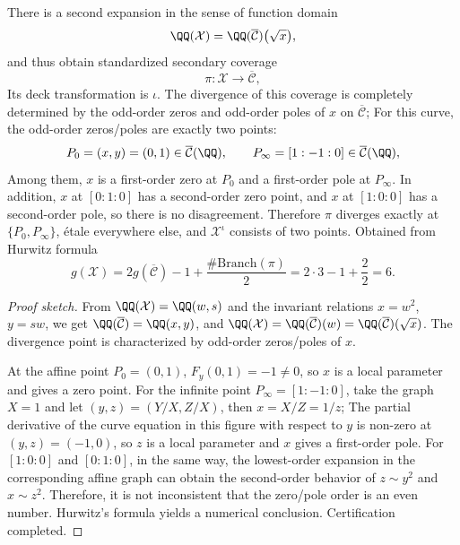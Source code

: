 \begin{proposition}[Second expansion and divergence: only two divergences and \texorpdfstring{$g(\mathcal{X})=6$}{g(X)=6}]\label{prop:sync-hatdelta-curve-double-cover-branch-genus6}
There is a second expansion in the sense of function domain
\[
\QQ(\mathcal{X})=\QQ(\overline{\mathcal{C}})\bigl(\sqrt{x}\bigr),
\]
and thus obtain standardized secondary coverage
\[
\pi:\mathcal{X}\longrightarrow\overline{\mathcal{C}},
\]
Its deck transformation is \(\iota\).
The divergence of this coverage is completely determined by the odd-order zeros and odd-order poles of \(x\) on \(\overline{\mathcal{C}}\);
For this curve, the odd-order zeros/poles are exactly two points:
\[
P_0=(x,y)=(0,1)\in \overline{\mathcal{C}}(\QQ),\qquad
P_\infty=[1:-1:0]\in \overline{\mathcal{C}}(\QQ),
\]
Among them, \(x\) is a first-order zero at \(P_0\) and a first-order pole at \(P_\infty\).
In addition, \(x\) at \([0:1:0]\) has a second-order zero point, and \(x\) at \([1:0:0]\) has a second-order pole, so there is no disagreement.
Therefore \(\pi\) diverges exactly at \(\{P_0,P_\infty\}\), \'{e}tale everywhere else, and \(\mathcal{X}^{\iota}\) consists of two points.
Obtained from Hurwitz formula
\[
g(\mathcal{X})
=2g(\overline{\mathcal{C}})-1+\frac{\#\mathrm{Branch}(\pi)}{2}
=2\cdot 3-1+\frac{2}{2}
=6.
\]
\end{proposition}
\begin{proof}[Proof sketch]
From \(\QQ(\mathcal{X})=\QQ(w,s)\) and the invariant relations \(x=w^2\), \(y=sw\), we get \(\QQ(\overline{\mathcal{C}})=\QQ(x,y)\), and \(\QQ(\mathcal{X})=\QQ(\overline{\mathcal{C}})(w)=\QQ(\overline{\mathcal{C}})(\sqrt{x})\).
The divergence point is characterized by odd-order zeros/poles of \(x\).
\par
At the affine point \(P_0=(0,1)\), \(F_y(0,1)=-1\neq 0\), so \(x\) is a local parameter and gives a zero point.
For the infinite point \(P_\infty=[1:-1:0]\), take the graph \(X=1\) and let \((y,z)=(Y/X,Z/X)\), then \(x=X/Z=1/z\);
The partial derivative of the curve equation in this figure with respect to \(y\) is non-zero at \((y,z)=(-1,0)\), so \(z\) is a local parameter and \(x\) gives a first-order pole.
For \([1:0:0]\) and \([0:1:0]\), in the same way, the lowest-order expansion in the corresponding affine graph can obtain the second-order behavior of \(z\sim y^2\) and \(x\sim z^2\). Therefore, it is not inconsistent that the zero/pole order is an even number.
Hurwitz's formula yields a numerical conclusion. Certification completed.
\end{proof}

